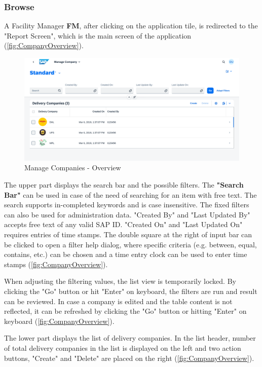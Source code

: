 \subsubsection{Browse}
A Facility Manager \textbf{FM}, after clicking on the application tile, is redirected to the "Report Screen", which is the main screen of the application (\autoref{fig:CompanyOverview}). 

\begin{figure}[H]
	\centering
	\includegraphics[width=1\linewidth]{images/user_doc/company/report/overview.png}
	\caption{Manage Companies - Overview}
	\label{fig:CompanyOverview}
\end{figure}

The upper part displays the search bar and the possible filters. 
The \textbf{"Search Bar"} can be used in case of the need of searching for an item with free text. The search supports in-completed keywords and is case insensitive. The fixed filters can also be used for administration data. "Created By" and "Last Updated By" accepts free text of any valid SAP ID. "Created On" and "Last Updated On" requires entries of time stamps. The double square at the right of input bar can be clicked to open a filter help dialog, where specific criteria (e.g. between, equal, contains, etc.) can be chosen and a time entry clock can be used to enter time stamps (\autoref{fig:CompanyOverview}). 

When adjusting the filtering values, the list view is temporarily locked. By clicking the "Go" button or hit "Enter" on keyboard, the filters are run and result can be reviewed. In case a company is edited and the table content is not reflected, it can be refreshed by clicking the "Go" button or hitting "Enter" on keyboard (\autoref{fig:CompanyOverview}). 

The lower part displays the list of delivery companies. In the list header, number of total delivery companies in the list is displayed on the left and two action buttons, "Create" and "Delete" are placed on the right (\autoref{fig:CompanyOverview}). 

